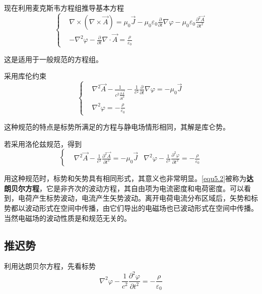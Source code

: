 \documentclass[UTF8]{ctexart}
\begin{document}
    现在利用麦克斯韦方程组推导基本方程
    \begin{equation}
        \left \{ \begin{aligned}
            &\nabla \times (\nabla \times \vec{A}) = \mu_0 \vec{J} - \mu_0 \varepsilon_0 \frac{\partial}{\partial t} \nabla \varphi - \mu_0 \varepsilon_0 \frac{\partial^2 \vec{A}}{\partial t^2} \\
            &-\nabla^2 \varphi - \frac{\partial}{\partial t} \nabla \cdot \vec{A} = \frac{\rho}{\varepsilon_0}
        \end{aligned} \right.
    \end{equation}

\noindent 这是适用于一般规范的方程组。

    采用库伦约束
    \begin{equation}
        \left \{ \begin{aligned}
            &\nabla^2 \vec{A} - \frac{1}{c^2 \frac{\partial \vec{A}}{\partial t^2}} - \frac{1}{c^2} \frac{\partial}{\partial t} \nabla \varphi = - \mu_0 \vec{J}\\
            &\nabla^2 \varphi = - \frac{\rho}{\varepsilon_0}
        \end{aligned} \right.
    \end{equation}

\noindent 这种规范的特点是标势所满足的方程与静电场情形相同，其解是库仑势。

    若采用洛伦兹规范，得到
    \begin{equation}
        \left \{ \begin{aligned}
            &\nabla^2 \vec{A} - \frac{1}{c^2} \frac{\partial^2 \vec{A}}{\partial t^2} = - \mu_0 \vec{J}
            & \nabla^2 \varphi - \frac{1}{c^2} \frac{\partial^2 \varphi}{\partial t^2} = -\frac{\rho}{\varepsilon_0}
        \end{aligned} \right.\label{equ5.2}
    \end{equation}

\noindent 用这种规范时，标势和矢势具有相同形式，其意义也非常明显。\autoref{equ5.2}被称为\textbf{达朗贝尔方程}，它是非齐次的波动方程，其自由项为电流密度和电荷密度。可以看到，电荷产生标势波动，电流产生矢势波动。离开电荷电流分布区域后，矢势和标势都以波动形式在空间中传播，由它们导出的电磁场也已波动形式在空间中传播。当然电磁场的波动性质是和规范无关的。

    \subsection{推迟势}
    利用达朗贝尔方程，先看标势
    \begin{equation}
        \nabla^{2} \varphi-\frac{1}{c^{2}} \frac{\partial^{2} \varphi}{\partial t^{2}}=-\frac{\rho}{\varepsilon_{0}}
        \end{equation}
    
\end{document}
